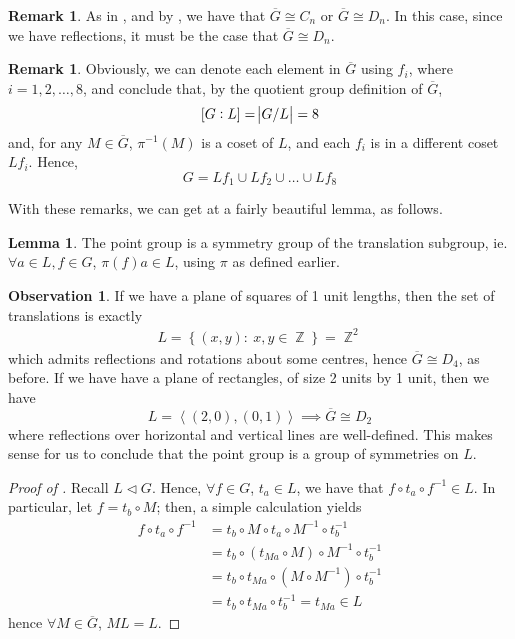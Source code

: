 \documentclass[11pt]{amsart} %
\theoremstyle{definition}
\newtheorem{lemma}[definition]{Lemma}
\newtheorem{obs}[definition]{Observation}
\theoremstyle{definition}
\newtheorem{remark}[definition]{Remark}
\DeclareMathOperator{\Z}{\mathbb{Z}}
\numberwithin{equation}{section}
\newcommand{\condset}[4]{\left\{ #1  : \: #2 #3 #4 \right\}}
\newcommand{\cyclic}[1]{\left\langle #1 \right\rangle}
\begin{document}
\begin{remark}
	As in , and by , we have that $\overline{G} \cong C_n$ or $\overline{G} \cong D_n$. In this case, since we have reflections, it must be the case that $\overline{G} \cong D_n$.
\end{remark}

\begin{remark}
	Obviously, we can denote each element in $\overline{ G}$ using $f_i$, where $i=1,2,\dots,8$, and conclude that, by the quotient group definition of $\overline{ G}$,
	$$ [G:L] = \abs{G/L} = 8 $$
	and, for any $M \in \overline{ G}$, $\pi^{-1} (M)$ is a coset of $L$, and each $f_i$ is in a different coset $L f_i$. Hence,
	$$ G = L f_1 \cup L f_2 \cup \dots \cup L f_8 $$
\end{remark}

With these remarks, we can get at a fairly beautiful lemma, as follows.

\begin{lemma}
	\label{lempgassymmetryofts}
	The point group is a symmetry group of the translation subgroup, ie. $\forall a\in L, f\in G$, $\pi (f) a \in L$, using $\pi$ as defined earlier.
\end{lemma}

\begin{obs}
	If we have a plane of squares of 1 unit lengths, then the set of translations is exactly
	\begin{align*}
	L =\condset{ (x,y)}{ x,y }{\in}{ \Z} = \Z^2
	\end{align*}
	which admits reflections and rotations about some centres, hence $\overline{ G} \cong D_4$, as before. If we have have a plane of rectangles, of size 2 units by 1 unit, then we have
	$$ L = \cyclic{ (2,0) , (0,1)} \implies \overline{ G} \cong D_2 $$
	where reflections over horizontal and vertical lines are well-defined. This makes sense for us to conclude that the point group is a group of symmetries on $L$.
\end{obs}

\begin{proof}[Proof of ]
	Recall $L \lhd G$. Hence, $\forall f \in G$, $t_a \in L$, we have that $f \circ t_a \circ f^{-1} \in L$. In particular, let $f = t_b \circ M$; then, a simple calculation yields
	\begin{align*}
	f \circ t_a  \circ f^{-1} &= t_b \circ M \circ t_a \circ M^{-1} \circ t_b^{-1} \\
	&= t_b  \circ (t_{Ma} \circ M) \circ M^{-1} \circ t_b^{-1} \\
	&= t_b  \circ t_{Ma} \circ (M \circ M^{-1}) \circ t_b^{-1} 	\\
	&= t_b  \circ t_{Ma} \circ t_b^{-1}  = t_{Ma} \in L
	\end{align*}
	hence $\forall M \in\overline{ G}$, $ML = L$.
\end{proof}
\end{document}
